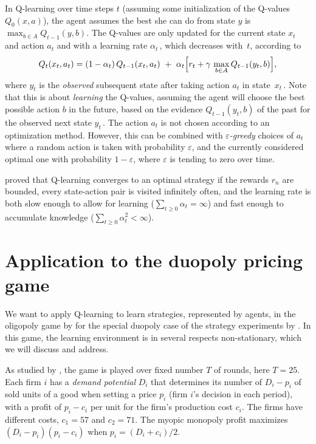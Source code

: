 \documentclass[a4paper,12pt]{article}  %
\theoremstyle{definition}
\def\eps{\varepsilon}
\begin{document}
In Q-learning over time steps $t$ (assuming some
initialization of the Q-values $Q_0(x,a)$), the agent
assumes the best she can do from state $y$ is 
$\max_{b\in A}Q_{t-1}(y,b)$. 
The Q-values are only updated for the current state $x_t$
and action $a_t$ and with a learning rate $\alpha_t$\,, which
decreases with~$t$, according to 
\begin{equation}
\label{wd1}
Q_t(x_t,a_t)=(1-\alpha_t)\,Q_{t-1}(x_t,a_t)~+~\alpha_t\Bigl[
r_t+\gamma\,\max_{b\in A}Q_{t-1}(y_t,b)\Bigr], 
\end{equation}
where $y_t$ is the \textit{observed} subsequent state after
taking action $a_t$ in state~$x_t$\,.
Note that this is about \textit{learning} the Q-values,
assuming the agent will choose the best possible action $b$ in
the future, based on the evidence $Q_{t-1}(y_t,b)$ of the
past for the observed next state $y_t$\,.
The action $a_t$ is not chosen according to an optimization
method.
However, this can be combined with \textit{$\eps$-greedy}
choices of $a_t$ where a random action is taken with
probability $\eps$, and the currently considered optimal one
with probability $1-\eps$, where $\eps$ is tending to zero
over time.

\citet {WD92} proved that Q-learning converges to an optimal
strategy if the rewards $r_n$ are bounded, 
every state-action pair is visited infinitely often, and the
learning rate is both slow enough to allow for learning
($\sum_{t\ge0} \alpha_t=\infty$) and fast enough to
accumulate knowledge ($\sum_{t\ge0} \alpha_t^2<\infty$).

\section{Application to the duopoly pricing game} 
\label{s-appl}

We want to apply Q-learning to learn strategies, represented 
by agents, in the oligopoly game by \citet{Selten1965} for
the special duopoly case of the strategy experiments by
\citet{Keser1992}.
In this game, the learning environment is in several
respects non-stationary, which we will discuss and address.

As studied by \citet{Keser1992}, the game is played over
fixed number $T$ of rounds, here $T=25$.
Each firm $i$ has a \textit{demand potential} $D_i$
that determines its number of $D_i-p_i$ of sold units of a
good when setting a price $p_i$ (firm $i$'s decision in each
period), with a profit of $p_i-c_i$ per unit for the firm's
production cost $c_i$.
The firms have different costs, $c_1=57$ and $c_2=71$.
The myopic monopoly profit maximizes $(D_i-p_i)(p_i-c_i)$
when $p_i=(D_i+c_i)/2$.
\end{document}
